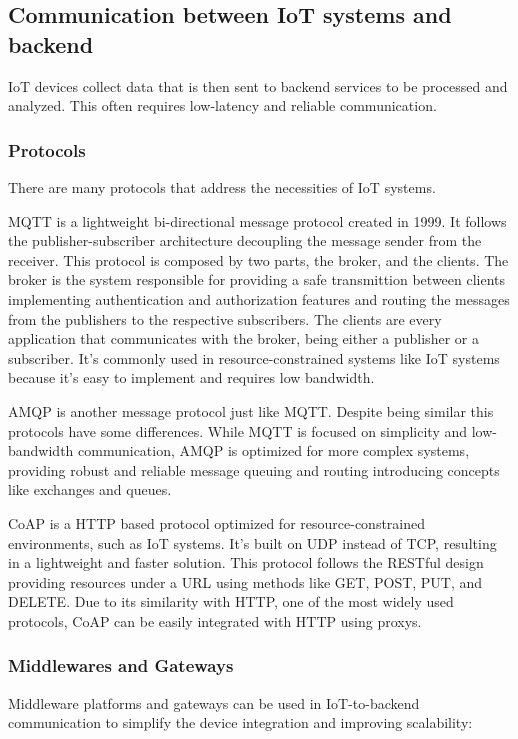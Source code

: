 \subsection{Communication between IoT systems and backend}
\gls{IoT} devices collect data that is then sent to backend services to be processed
and analyzed. This often requires low-latency and reliable communication.
\subsubsection{Protocols}
There are many protocols that address the necessities of \gls{IoT} systems.

MQTT is a lightweight bi-directional message protocol created in 1999.
It follows the publisher-subscriber architecture decoupling the message
sender from the receiver. This protocol is composed by two parts, the
broker, and the clients. The broker is the system responsible for providing
a safe transmittion between clients implementing authentication and
authorization features and routing the messages from the publishers to
the respective subscribers. The clients are every application that
communicates with the broker, being either a publisher or a subscriber.
It's commonly used in resource-constrained systems like IoT systems because
it's easy to implement and requires low bandwidth\cite{Jayapal2019, CommunicationProtocols}.

\gls{AMQP} is another message protocol just like \gls{MQTT}.
Despite being similar this protocols have some differences. While \gls{MQTT} is
focused on simplicity and low-bandwidth communication, \gls{AMQP} is optimized for
more complex systems, providing robust and reliable message queuing and
routing introducing concepts like exchanges and queues\cite{CommunicationProtocols}.

\gls{CoAP} is a \gls{HTTP} based protocol optimized for resource-constrained
environments, such as \gls{IoT} systems. It's built on \gls{UDP} instead of \gls{TCP},
resulting in a lightweight and faster solution.
This protocol follows the \gls{REST}ful design providing resources under a \gls{URL}
using methods like GET, POST, PUT, and DELETE. Due to its similarity with
\gls{HTTP}, one of the most widely used protocols, \gls{CoAP} can be easily integrated
with \gls{HTTP} using proxys\cite{coap, Jayapal2019}.

\subsubsection{Middlewares and Gateways}
Middleware platforms and gateways can be used in \gls{IoT}-to-backend
communication to simplify the device integration and improving scalability:

